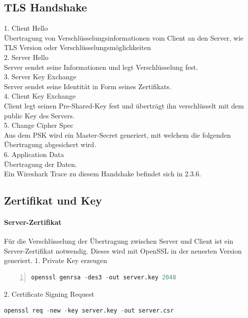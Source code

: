 \subsection{TLS Handshake}
1. Client Hello\\
Übertragung von Verschlüsselungsinformationen vom Client an den Server, wie TLS Version oder Verschlüsselungsmöglichkeiten\\
2. Server Hello \\
Server sendet seine Informationen und legt Verschlüsselung fest. \\
3. Server Key Exchange\\
Server sendet seine Identität in Form seines Zertifikats. \\
4. Client Key Exchange\\
Client legt seinen Pre-Shared-Key fest und überträgt ihn verschlüsselt mit dem public Key des Servers.\\
5. Change Cipher Spec\\
Aus dem PSK wird ein Master-Secret generiert, mit welchem die folgenden Übertragung abgesichert wird. \\
6. Application Data\\
Übertragung der Daten. \\
Ein Wireshark Trace zu diesem Handshake befindet sich in 2.3.6.\\
\subsection{Zertifikat und Key}

\paragraph{Server-Zertifikat}
Für die Verschlüsselung der Übertragung zwischen Server und Client ist ein Server-Zertifikat notwendig. Dieses wird mit OpenSSL in der neuesten Version generiert.
1. Private Key erzeugen
\begin{lstlisting}[caption =private Key, language=python, frame=single, breaklines=true,columns=fullflexible, commentstyle=\color{gray}\upshape, captionpos=b, numbers = left]
openssl genrsa -des3 -out server.key 2048
\end{lstlisting}

2. Certificate Signing Request
\begin{lstlisting}[caption =Certificate Signing Request, language=python, frame=single, breaklines=true,columns=fullflexible, commentstyle=\color{gray}\upshape, captionpos=b]
openssl req -new -key server.key -out server.csr
\end{lstlisting}


